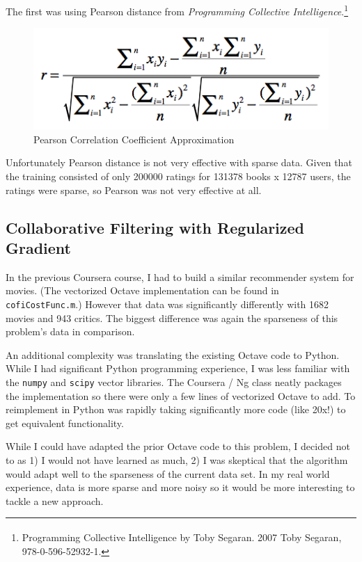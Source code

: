 \documentclass[11pt, oneside]{article}   	%
\begin{document}
The first was using Pearson distance from \emph{Programming Collective Intelligence}.\footnote{Programming Collective Intelligence by Toby Segaran. \textsuperscript{\textcopyright} 2007 Toby Segaran, 978-0-596-52932-1.}

\begin{figure}[h!]
\centering
\includegraphics[scale=0.6]{pearson}
\caption{Pearson Correlation Coefficient Approximation}
\end{figure}

Unfortunately Pearson distance is not very effective with sparse data. Given that the training consisted of only 200000 ratings for 131378 books x 12787 users, the ratings were sparse, so Pearson was not very effective at all.

\subsection*{Collaborative Filtering with Regularized Gradient}

\par In the previous Coursera course, I had to build a similar recommender system for movies. (The vectorized Octave implementation can be found in \texttt{cofiCostFunc.m}.) However that data was significantly differently with 1682 movies and 943 critics. The biggest difference was again the sparseness of this problem's data in comparison.

An additional complexity was translating the existing Octave code to Python. While I had significant Python programming experience, I was less familiar with the \texttt{numpy} and \texttt{scipy} vector libraries. The Coursera / Ng class neatly packages the implementation so there were only a few lines of vectorized Octave to add. To reimplement in Python was rapidly taking significantly more code (like 20x!) to get equivalent functionality. 

While I could have adapted the prior Octave code to this problem, I decided not to as 1) I would not have learned as much, 2) I was skeptical that the algorithm would adapt well to the sparseness of the current data set. In my real world experience, data is more sparse and more noisy so it would be more interesting to tackle a new approach.
\end{document}
